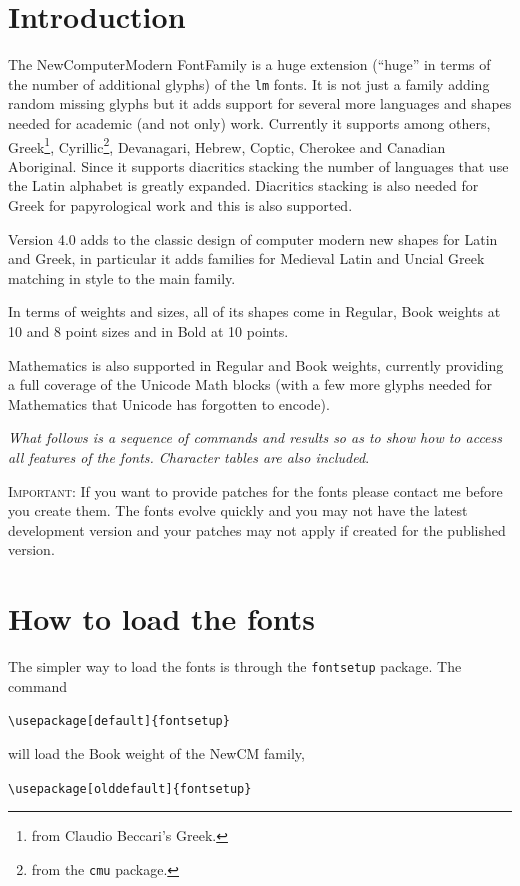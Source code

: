 \documentclass{article}
\begin{document}
\section{Introduction}
The NewComputerModern FontFamily is a huge extension (``huge'' in terms of
the number of additional glyphs)
of the \verb|lm| fonts. It is not just a family adding random missing glyphs but it
adds support for several more languages and shapes needed for academic (and not only) work.
Currently it supports among others, Greek\footnote{from Claudio Beccari's Greek.},
Cyrillic\footnote{from the \texttt{cmu} package.}, Devanagari, Hebrew, Coptic, Cherokee and
Canadian Aboriginal. Since it supports
diacritics stacking the number of languages that use the Latin alphabet is greatly expanded. 
Diacritics stacking is also needed for Greek for papyrological work and this is also supported.

Version 4.0 adds to the classic design of computer modern new shapes for Latin and Greek,
in particular it adds families for Medieval Latin and Uncial Greek matching in style to the
main family.

In terms of weights and sizes, all of its shapes come in Regular, Book weights
at 10 and 8 point sizes and in Bold at 10 points.

Mathematics is also supported in Regular and Book weights, currently providing
a full coverage of the Unicode Math blocks (with a few more glyphs needed for Mathematics
that Unicode has forgotten to encode).

\textit{What follows is a sequence of commands and results so as to show how to access all features
of the fonts. Character tables are also included}.

\textsc{Important:} If you want to provide patches for the fonts
please contact me before you create them. The fonts evolve quickly
and you may not have the latest development version and your patches
may not apply if created for the published version.



\section{How to load the fonts}
The simpler way to load the fonts is through the \verb|fontsetup| package. The command

\verb|\usepackage[default]{fontsetup}|

\noindent will load the Book weight of the NewCM family, 

\verb|\usepackage[olddefault]{fontsetup}|
\end{document}

